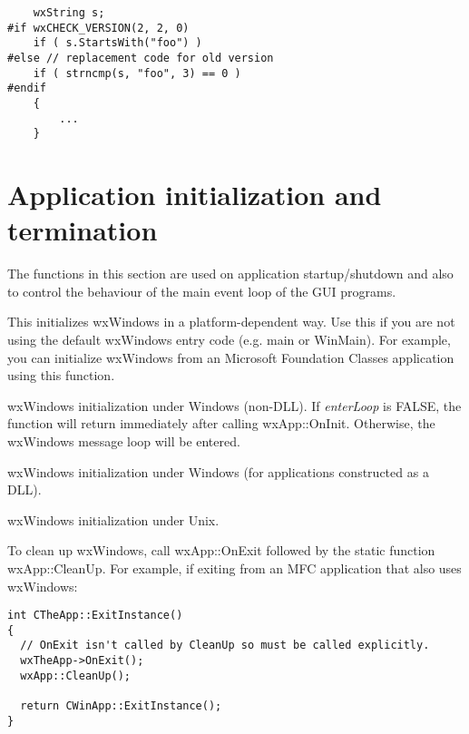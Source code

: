 \begin{verbatim}
    wxString s;
#if wxCHECK_VERSION(2, 2, 0)
    if ( s.StartsWith("foo") )
#else // replacement code for old version
    if ( strncmp(s, "foo", 3) == 0 )
#endif
    {
        ...
    }
\end{verbatim}

\section{Application initialization and termination}\label{appinifunctions}

The functions in this section are used on application startup/shutdown and also
to control the behaviour of the main event loop of the GUI programs.

\label{wxentry}

This initializes wxWindows in a platform-dependent way. Use this if you
are not using the default wxWindows entry code (e.g. main or WinMain). For example,
you can initialize wxWindows from an Microsoft Foundation Classes application using
this function.


wxWindows initialization under Windows (non-DLL). If {\it enterLoop} is FALSE, the
function will return immediately after calling wxApp::OnInit. Otherwise, the wxWindows
message loop will be entered.


wxWindows initialization under Windows (for applications constructed as a DLL).


wxWindows initialization under Unix.


To clean up wxWindows, call wxApp::OnExit followed by the static function
wxApp::CleanUp. For example, if exiting from an MFC application that also uses wxWindows:

\begin{verbatim}
int CTheApp::ExitInstance()
{
  // OnExit isn't called by CleanUp so must be called explicitly.
  wxTheApp->OnExit();
  wxApp::CleanUp();

  return CWinApp::ExitInstance();
}
\end{verbatim}


